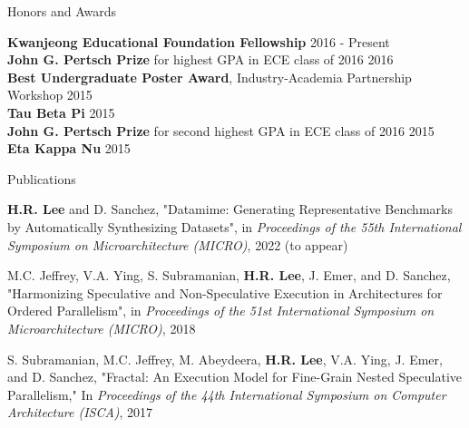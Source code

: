 \documentclass{resume} %
\begin{document}
\newpage


\begin{rSection}{Honors and Awards}

{\bf Kwanjeong Educational Foundation Fellowship} \hfill {2016 - Present} \\
{\bf John G. Pertsch Prize} for highest GPA in ECE class of 2016 \hfill{2016} \\
{\bf Best Undergraduate Poster Award}, Industry-Academia Partnership Workshop \hfill {2015} \\
{\bf Tau Beta Pi} \hfill {2015} \\
{\bf John G. Pertsch Prize} for second highest GPA in ECE class of 2016 \hfill {2015} \\
{\bf Eta Kappa Nu} \hfill {2015} 

\end{rSection}


\begin{rSection}{Publications}

{\bf H.R. Lee} and D. Sanchez,
"Datamime: Generating Representative Benchmarks by Automatically Synthesizing Datasets",
in \textit{Proceedings of the 55th International Symposium on Microarchitecture (MICRO)}, 2022 (to appear) %

M.C. Jeffrey, V.A. Ying, S. Subramanian, {\bf H.R. Lee}, J. Emer, and D. Sanchez,
"Harmonizing Speculative and Non-Speculative Execution in Architectures for Ordered Parallelism",
in \textit{Proceedings of the 51st International Symposium on Microarchitecture (MICRO)}, 2018 %

S. Subramanian, M.C. Jeffrey, M. Abeydeera, {\bf H.R. Lee}, V.A. Ying, J. Emer, and D. Sanchez, 
"Fractal: An Execution Model for Fine-Grain Nested Speculative Parallelism,"
In \textit{Proceedings of the 44th International Symposium on Computer Architecture (ISCA)}, 2017 %

\end{rSection}

\end{document}
